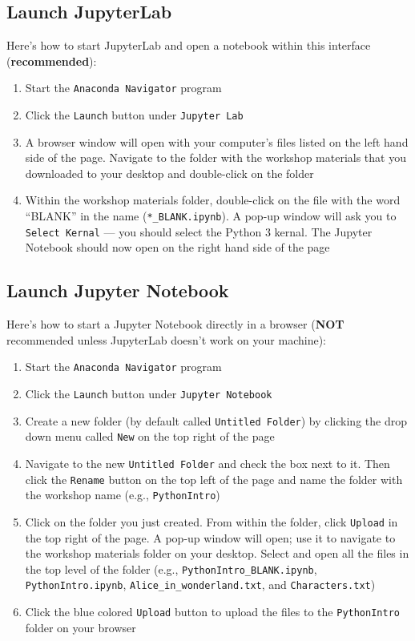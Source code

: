 \documentclass[]{book}
\providecommand{\tightlist}{%
  \setlength{\itemsep}{0pt}\setlength{\parskip}{0pt}}
\begin{document}
\subsection{Launch JupyterLab}\label{launch-jupyterlab}

Here's how to start JupyterLab and open a notebook within this interface
(\textbf{recommended}):

\begin{enumerate}
\def\labelenumi{\arabic{enumi}.}
\tightlist
\item
  Start the \texttt{Anaconda\ Navigator} program
\item
  Click the \texttt{Launch} button under \texttt{Jupyter\ Lab}
\item
  A browser window will open with your computer's files listed on the
  left hand side of the page. Navigate to the folder with the workshop
  materials that you downloaded to your desktop and double-click on the
  folder
\item
  Within the workshop materials folder, double-click on the file with
  the word ``BLANK'' in the name (\texttt{*\_BLANK.ipynb}). A pop-up
  window will ask you to \texttt{Select\ Kernal} --- you should select
  the Python 3 kernal. The Jupyter Notebook should now open on the right
  hand side of the page
\end{enumerate}

\subsection{Launch Jupyter Notebook}\label{launch-jupyter-notebook}

Here's how to start a Jupyter Notebook directly in a browser
(\textbf{NOT} recommended unless JupyterLab doesn't work on your
machine):

\begin{enumerate}
\def\labelenumi{\arabic{enumi}.}
\tightlist
\item
  Start the \texttt{Anaconda\ Navigator} program
\item
  Click the \texttt{Launch} button under \texttt{Jupyter\ Notebook}
\item
  Create a new folder (by default called \texttt{Untitled\ Folder}) by
  clicking the drop down menu called \texttt{New} on the top right of
  the page
\item
  Navigate to the new \texttt{Untitled\ Folder} and check the box next
  to it. Then click the \texttt{Rename} button on the top left of the
  page and name the folder with the workshop name (e.g.,
  \texttt{PythonIntro})
\item
  Click on the folder you just created. From within the folder, click
  \texttt{Upload} in the top right of the page. A pop-up window will
  open; use it to navigate to the workshop materials folder on your
  desktop. Select and open all the files in the top level of the folder
  (e.g., \texttt{PythonIntro\_BLANK.ipynb}, \texttt{PythonIntro.ipynb},
  \texttt{Alice\_in\_wonderland.txt}, and \texttt{Characters.txt})
\item
  Click the blue colored \texttt{Upload} button to upload the files to
  the \texttt{PythonIntro} folder on your browser
\end{enumerate}
\end{document}
